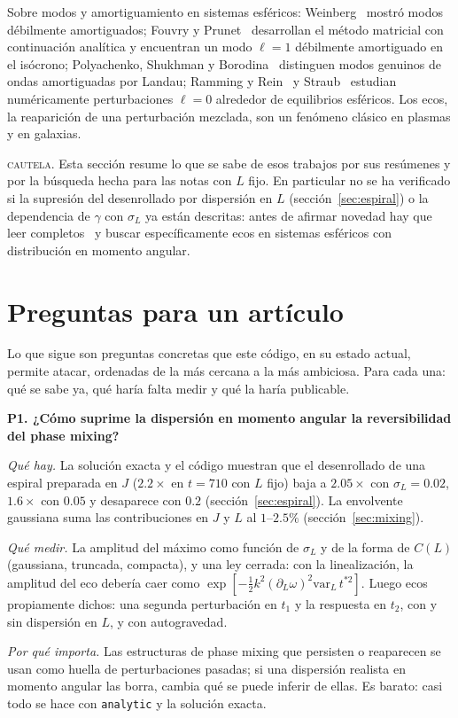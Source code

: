 \documentclass[11pt,a4paper]{article}
\begin{document}
Sobre modos y amortiguamiento en sistemas esféricos: Weinberg~\cite{weinberg1994} mostró
modos débilmente amortiguados; Fouvry y Prunet~\cite{fouvry2022} desarrollan el método
matricial con continuación analítica y encuentran un modo $\ell=1$ débilmente amortiguado
en el isócrono; Polyachenko, Shukhman y Borodina~\cite{polyachenko2021} distinguen modos
genuinos de ondas amortiguadas por Landau; Ramming y Rein~\cite{ramming2018} y
Straub~\cite{straub2024} estudian numéricamente perturbaciones $\ell=0$ alrededor de
equilibrios esféricos. Los ecos, la reaparición de una perturbación mezclada, son un
fenómeno clásico en plasmas y en galaxias.

\begin{aviso}
\textsc{cautela.} Esta sección resume lo que se sabe de esos trabajos por sus resúmenes y
por la búsqueda hecha para las notas con $L$ fijo. En particular no se ha verificado si
la supresión del desenrollado por dispersión en $L$ (sección~\ref{sec:espiral}) o la
dependencia de $\gamma$ con $\sigma_L$ ya están descritas: antes de afirmar novedad hay
que leer completos~\cite{fouvry2022,straub2024,chaturvedi2024} y buscar específicamente
ecos en sistemas esféricos con distribución en momento angular.
\end{aviso}

\section{Preguntas para un artículo}
\label{sec:preguntas}

Lo que sigue son preguntas concretas que este código, en su estado actual, permite atacar,
ordenadas de la más cercana a la más ambiciosa. Para cada una: qué se sabe ya, qué haría
falta medir y qué la haría publicable.

\begin{pregunta}
\textbf{P1. ¿Cómo suprime la dispersión en momento angular la reversibilidad del phase
mixing?}

\emph{Qué hay.} La solución exacta y el código muestran que el desenrollado de una espiral
preparada en $J$ ($2.2\times$ en $t=710$ con $L$ fijo) baja a $2.05\times$ con
$\sigma_L=0.02$, $1.6\times$ con $0.05$ y desaparece con $0.2$ (sección~\ref{sec:espiral}).
La envolvente gaussiana suma las contribuciones en $J$ y $L$ al $1$--$2.5\%$
(sección~\ref{sec:mixing}).

\emph{Qué medir.} La amplitud del máximo como función de $\sigma_L$ y de la forma de $C(L)$
(gaussiana, truncada, compacta), y una ley cerrada: con la linealización, la amplitud del
eco debería caer como $\exp[-\tfrac12k^2(\partial_L\omega)^2\mathrm{var}_L\,t^{*2}]$. Luego
ecos propiamente dichos: una segunda perturbación en $t_1$ y la respuesta en $t_2$, con y
sin dispersión en $L$, y con autogravedad.

\emph{Por qué importa.} Las estructuras de phase mixing que persisten o reaparecen se usan
como huella de perturbaciones pasadas; si una dispersión realista en momento angular las
borra, cambia qué se puede inferir de ellas. Es barato: casi todo se hace con \texttt{analytic} y la solución exacta.
\end{pregunta}
\end{document}
